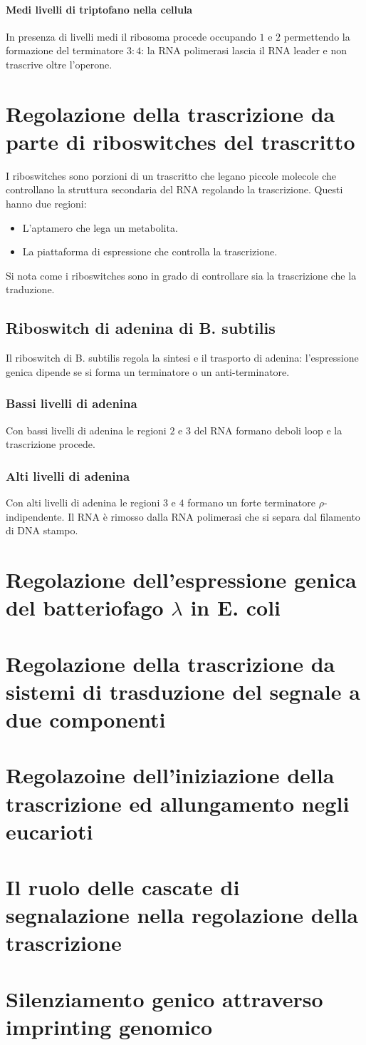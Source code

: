 \paragraph{Medi livelli di triptofano nella cellula}
In presenza di livelli medi il ribosoma procede occupando $1$ e $2$ permettendo la formazione del terminatore $3:4$: la RNA polimerasi lascia il RNA leader e non trascrive oltre 
l'operone. 
\section{Regolazione della trascrizione da parte di riboswitches del trascritto}
I riboswitches sono porzioni di un trascritto che legano piccole molecole che controllano la struttura secondaria del RNA regolando la trascrizione. Questi hanno due regioni: 
\begin{itemize}
	\item L'aptamero che lega un metabolita.
	\item La piattaforma di espressione che controlla la trascrizione. 
\end{itemize}
Si nota come i riboswitches sono in grado di controllare sia la trascrizione che la traduzione. 
\subsection{Riboswitch di adenina di B. subtilis}
Il riboswitch di B. subtilis regola la sintesi e il trasporto di adenina: l'espressione genica dipende se si forma un terminatore o un anti-terminatore.
\subsubsection{Bassi livelli di adenina}
Con bassi livelli di adenina le regioni $2$ e $3$ del RNA formano deboli loop e la trascrizione procede.
\subsubsection{Alti livelli di adenina}
Con alti livelli di adenina le regioni $3$ e $4$ formano un forte terminatore $\rho$-indipendente. Il RNA \`e rimosso dalla RNA polimerasi che si separa dal filamento di DNA stampo. 
\section{Regolazione dell'espressione genica del batteriofago $\lambda$ in E. coli}

\section{Regolazione della trascrizione da sistemi di trasduzione del segnale a due componenti}

\section{Regolazoine dell'iniziazione della trascrizione ed allungamento negli eucarioti}

\section{Il ruolo delle cascate di segnalazione nella regolazione della trascrizione}

\section{Silenziamento genico attraverso imprinting genomico}

